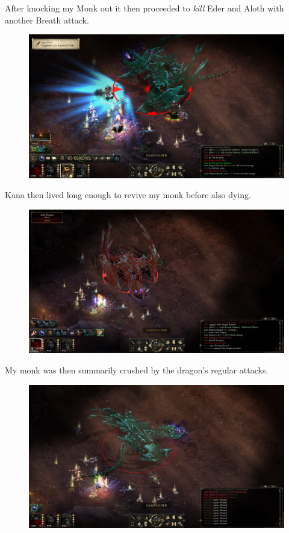 \documentclass{article}
\begin{document}
After knocking my Monk out it then proceeded to \emph{kill} Eder and Aloth with another Breath attack.

\begin{figure}
\includegraphics[scale=0.33]{files/blog/2019_03_17_pillars_of_eternity_path_of_the_damned_act_iv/2019_03_17_dragon1_10.jpg}
\end{figure}

Kana then lived long enough to revive my monk before also dying.

\begin{figure}
\includegraphics[scale=0.33]{files/blog/2019_03_17_pillars_of_eternity_path_of_the_damned_act_iv/2019_03_17_dragon1_11.jpg}
\end{figure}

My monk was then summarily crushed by the dragon's regular attacks.

\begin{figure}
\includegraphics[scale=0.33]{files/blog/2019_03_17_pillars_of_eternity_path_of_the_damned_act_iv/2019_03_17_dragon1_12.jpg}
\end{figure}
\end{document}
